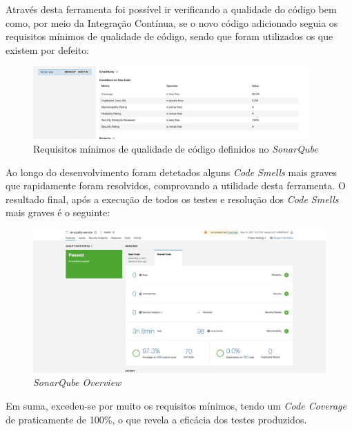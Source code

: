 \documentclass[10pt,english]{article}
\begin{document}
\par Através desta ferramenta foi possível ir verificando a qualidade do código bem como, por meio da Integração Contínua, se o novo código adicionado seguia os requisitos mínimos de qualidade de código, sendo que foram utilizados os que existem por defeito:

\begin{figure}[h]
    \centering
    \includegraphics[width=400]{images/quality-gate.png}
    \caption{Requisitos mínimos de qualidade de código definidos no \textit{SonarQube}}
\end{figure}

\clearpage


\par Ao longo do desenvolvimento foram detetados alguns \textit{Code Smells} mais graves que rapidamente foram resolvidos, comprovando a utilidade desta ferramenta. O resultado final, após a execução de todos os testes e resolução dos \textit{Code Smells} mais graves é o seguinte:

\begin{figure}[h]
    \centering
    \includegraphics[width=425]{images/sonar-qube-overview.png}
    \caption{\textit{SonarQube Overview}}
\end{figure}

\par Em suma, excedeu-se por muito os requisitos mínimos, tendo um \textit{Code Coverage} de praticamente de 100\%, o que revela a eficácia dos testes produzidos.
\end{document}
